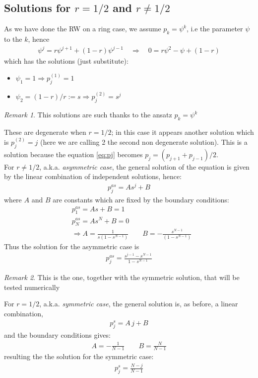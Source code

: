 \documentclass[4apaper,11pt,fleqn]{article}
\theoremstyle{remark}
\newtheorem*{rem}{Remark}
\theoremstyle{definition}
\begin{document}
\subsection{Solutions for $r=1/2$ and $r\neq 1/2$}
As we have done the RW on a ring case, we assume $p_k = \psi^k$, i.e the parameter $\psi$ to the $k$, hence
\begin{align*}
  \psi^j = r\psi^{j+1} + (1-r) \psi^{j-1} \quad \Rightarrow \quad 0 = r\psi^2 - \psi + (1-r)
\end{align*}
which has the solutions (just substitute):
\begin{itemize}[leftmargin=*]
  \item $\psi_1 = 1 \Rightarrow p_j^{(1)} = 1$
  \item $\psi_2 = (1-r)/r := s \Rightarrow  p_j^{(2)} = s^j$
\end{itemize}
\begin{rem}
  This solutions are such thanks to the ansatz $p_k = \psi^k$
\end{rem}
These are degenerate when $r=1/2$; in this case it appears another solution which is $p_j^{(2)} = j$ (here we are calling 2 the second non degenerate solution). This is a solution because the equation \eqref{eq:pj} becomes $p_j = (p_{j+1}+p_{j-1})/2$.\\
For $r\neq1/2$, a.k.a. \emph{asymmetric case}, the general solution of the equation is given by the linear combination of independent solutions, hence:
\begin{align*}
  p_j^{as} = As^j + B
\end{align*}
where $A$ and $B$ are constants which are fixed by the boundary conditions:
\begin{align*}
   &p_1^{as} = As + B = 1\\
   &p_N^{as} = As^N + B = 0\\
   &\Rightarrow A= \frac{1}{s(1-s^{N-1})} \qquad B = - \frac{s^{N-1}}{(1-s^{N-1})}
\end{align*}
Thus the solution for the asymmetric case is
\begin{align}
  \boxed{p_j^{as} = \frac{s^{j-1}-s^{N-1}}{1-s^{N-1}}}
\end{align}
\begin{rem}
  This is the one, together with the symmetric solution, that will be tested numerically
\end{rem}

For $r=1/2$, a.k.a. \emph{symmetric case}, the general solution is, as before, a linear combination,
\begin{align*}
    p_j^{s} = A \, j + B
\end{align*}
and the boundary conditions gives:
\begin{align*}
  A = -\frac{1}{N-1} \qquad B = \frac{N}{N-1}
\end{align*}
resulting the the solution for the symmetric case:
\begin{align}
  \label{eq:solS}
  \boxed{p_j^{s} = \frac{N-j}{N-1}}
\end{align}
\end{document}
